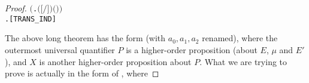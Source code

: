 \begin{proof}
\begin{alltt}
       \ensuremath{(}\HOLSymConst{\HOLTokenForall{}}   .  \ensuremath{(}\ensuremath{[}  \ensuremath{/}\ensuremath{]} \ensuremath{)}   \HOLSymConst{\HOLTokenImp{}}  \ensuremath{(}  \ensuremath{)}  \ensuremath{)} \HOLSymConst{\HOLTokenImp{}}
       \HOLSymConst{\HOLTokenForall{}}  .  \HOLTokenTransBegin{}\HOLTokenTransEnd {} \HOLSymConst{\HOLTokenImp{}}    \hfill{[TRANS_IND]}
\end{alltt}
The above long theorem has the form  (with $a_0, a_1, a_2$ renamed), where the
outermost universal quantifier $P$ is a higher-order
proposition (about $E$, $\mu$ and $E'$), and $X$ is another higher-order
proposition about $P$.
What we are trying to prove is actually in the form of
, where

\end{proof}
